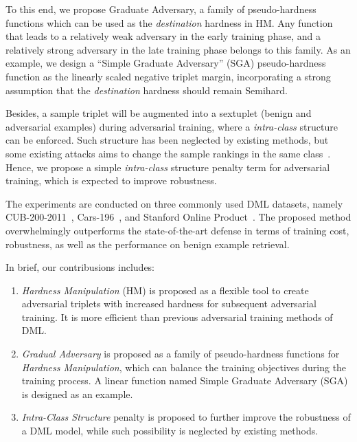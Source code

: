 \documentclass[10pt,twocolumn,letterpaper]{article}
\begin{document}

To this end, we propose Graduate Adversary, a family of pseudo-hardness
functions which can be used as the \emph{destination} hardness in HM.
%
Any function that leads to a relatively weak adversary in the early training
phase, and a relatively strong adversary in the late training phase belongs to
this family.
%
As an example, we design a ``Simple Graduate Adversary'' (SGA) pseudo-hardness
function as the linearly scaled negative triplet margin, incorporating a strong
assumption that the \emph{destination} hardness should remain Semihard.
%


Besides, a sample triplet will be augmented into a sextuplet (benign and
adversarial examples) during adversarial training, where a \emph{intra-class}
structure can be enforced.
%
Such structure has been neglected by existing methods, but some existing
attacks aims to change the sample rankings in the same class~\cite{advrank}.
%
Hence, we propose a simple \emph{intra-class} structure penalty term for
adversarial training, which is expected to improve robustness.

The experiments are conducted on three commonly used DML datasets, namely
CUB-200-2011~\cite{cub200}, Cars-196~\cite{cars196}, and Stanford Online
Product~\cite{sop}.
%
The proposed method overwhelmingly outperforms the state-of-the-art defense in
terms of training cost, robustness, as well as the performance on benign
example retrieval.

In brief, our contribusions includes:
%
\begin{enumerate}[nosep, noitemsep, leftmargin=*]
	\item {\textit{Hardness Manipulation}} (HM) is proposed as a flexible tool
		to create adversarial triplets with increased hardness for
		subsequent adversarial training.
		It is more efficient than previous adversarial training methods of DML.
	\item \textit{Gradual Adversary} is proposed as a family of pseudo-hardness
		functions for \emph{Hardness Manipulation}, which can balance the
		training objectives during the training process.
		A linear function named Simple Graduate Adversary (SGA) is designed as
		an example.
	\item \textit{Intra-Class Structure} penalty is proposed to further improve
		the robustness of a DML model, while such possibility is neglected by
		existing methods. 
\end{enumerate}
\end{document}
